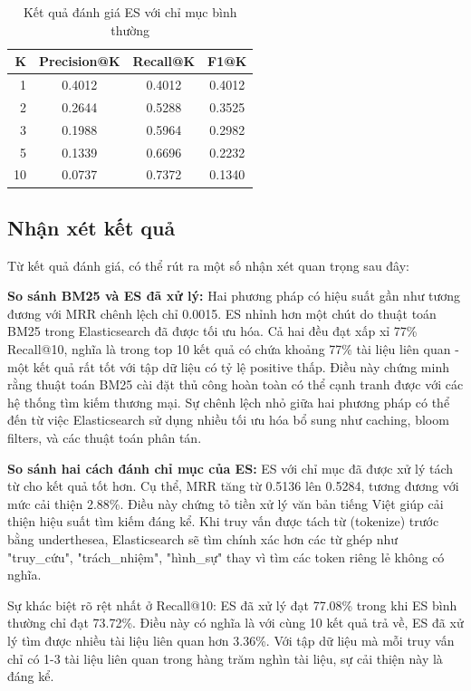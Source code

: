 \documentclass[../BTL.tex]{subfiles}
\begin{document}
\begin{table}[H]
\centering
\begin{tabular}{rccc}
\hline
K & Precision@K & Recall@K & F1@K \\
\hline
1  & 0.4012 & 0.4012 & 0.4012 \\
2  & 0.2644 & 0.5288 & 0.3525 \\
3  & 0.1988 & 0.5964 & 0.2982 \\
5  & 0.1339 & 0.6696 & 0.2232 \\
10 & 0.0737 & 0.7372 & 0.1340 \\
\hline
\end{tabular}
\caption{Kết quả đánh giá ES với chỉ mục bình thường}
\end{table}


\subsection{Nhận xét kết quả}

Từ kết quả đánh giá, có thể rút ra một số nhận xét quan trọng sau đây:

\textbf{So sánh BM25 và ES đã xử lý:}
Hai phương pháp có hiệu suất gần như tương đương với MRR chênh lệch chỉ 0.0015. ES nhỉnh hơn một chút do thuật toán BM25 trong Elasticsearch đã được tối ưu hóa. Cả hai đều đạt xấp xỉ 77\% Recall@10, nghĩa là trong top 10 kết quả có chứa khoảng 77\% tài liệu liên quan - một kết quả rất tốt với tập dữ liệu có tỷ lệ positive thấp. Điều này chứng minh rằng thuật toán BM25 cài đặt thủ công hoàn toàn có thể cạnh tranh được với các hệ thống tìm kiếm thương mại. Sự chênh lệch nhỏ giữa hai phương pháp có thể đến từ việc Elasticsearch sử dụng nhiều tối ưu hóa bổ sung như caching, bloom filters, và các thuật toán phân tán.

\textbf{So sánh hai cách đánh chỉ mục của ES:}
ES với chỉ mục đã được xử lý tách từ cho kết quả tốt hơn. Cụ thể, MRR tăng từ 0.5136 lên 0.5284, tương đương với mức cải thiện 2.88\%. Điều này chứng tỏ tiền xử lý văn bản tiếng Việt giúp cải thiện hiệu suất tìm kiếm đáng kể. Khi truy vấn được tách từ (tokenize) trước bằng underthesea, Elasticsearch sẽ tìm chính xác hơn các từ ghép như "truy\_cứu", "trách\_nhiệm", "hình\_sự" thay vì tìm các token riêng lẻ không có nghĩa.

Sự khác biệt rõ rệt nhất ở Recall@10: ES đã xử lý đạt 77.08\% trong khi ES bình thường chỉ đạt 73.72\%. Điều này có nghĩa là với cùng 10 kết quả trả về, ES đã xử lý tìm được nhiều tài liệu liên quan hơn 3.36\%. Với tập dữ liệu mà mỗi truy vấn chỉ có 1-3 tài liệu liên quan trong hàng trăm nghìn tài liệu, sự cải thiện này là đáng kể.
\end{document}
